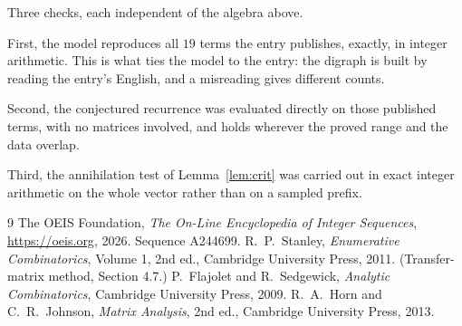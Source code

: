 \documentclass[11pt,a4paper]{article}
\theoremstyle{plain}
\theoremstyle{definition}
\begin{document}
Three checks, each independent of the algebra above.

First, the model reproduces all $19$ terms the entry publishes, exactly, in integer
arithmetic. This is what ties the model to the entry: the digraph is built by reading the
entry's English, and a misreading gives different counts.

Second, the conjectured recurrence was evaluated directly on those published terms, with no
matrices involved, and holds wherever the proved range and the data overlap.

Third, the annihilation test of Lemma~\ref{lem:crit} was carried out in exact integer
arithmetic on the whole vector rather than on a sampled prefix.

\begin{thebibliography}{9}
 The OEIS Foundation, \emph{The On-Line Encyclopedia of Integer
Sequences}, \url{https://oeis.org}, 2026. Sequence A244699.
 R.~P.~Stanley, \emph{Enumerative Combinatorics}, Volume 1, 2nd ed.,
Cambridge University Press, 2011. (Transfer-matrix method, Section 4.7.)
 P.~Flajolet and R.~Sedgewick, \emph{Analytic Combinatorics}, Cambridge
University Press, 2009.
 R.~A.~Horn and C.~R.~Johnson, \emph{Matrix Analysis}, 2nd ed., Cambridge
University Press, 2013.
\end{thebibliography}
\end{document}
